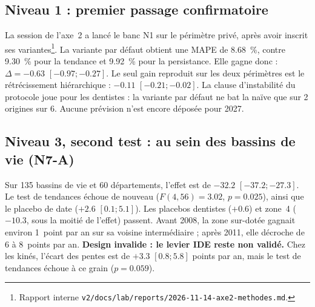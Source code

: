 \documentclass[11pt]{article}
\begin{document}
\subsection{Niveau 1 : premier passage confirmatoire}
La session de l'axe~2 a lancé le banc N1 sur le périmètre privé, après avoir inscrit ses
variantes\footnote{Rapport interne \texttt{v2/docs/lab/reports/2026-11-14-axe2-methodes.md}.}. La
variante par défaut obtient une MAPE de \num{8.68}\mesure{}~\%, contre \num{9.30}\mesure{}~\% pour la
tendance et \num{9.92}\mesure{}~\% pour la persistance. Elle gagne donc :
$\Delta = \num{-0.63}$\mesure{} $[\num{-0.97} ; \num{-0.27}]$. Le seul gain reproduit sur les deux
périmètres est le rétrécissement hiérarchique : $-\num{0.11}$\mesure{} $[\num{-0.21} ;
\num{-0.02}]$. La clause d'instabilité du protocole joue pour les dentistes : la variante par défaut
ne bat la naïve que sur 2\mesure{} origines sur 6. Aucune prévision n'est encore déposée pour 2027.

\subsection{Niveau 3, second test : au sein des bassins de vie (N7-A)}
Sur 135\mesure{} bassins de vie et 60\mesure{} départements, l'effet est de
$\num{-32.2}$\mesure{} $[\num{-37.2} ; \num{-27.3}]$. Le test de tendances échoue de nouveau
($F(4, 56) = \num{3.02}$, $p = \num{0.025}$\mesure{}), ainsi que le placebo de date ($+\num{2.6}$\mesure{}
$[\num{0.1} ; \num{5.1}]$). Les placebos dentistes ($+\num{0.6}$\mesure{}) et zone~4
($\num{-10.3}$\mesure{}, sous la moitié de l'effet) passent. Avant 2008, la zone sur-dotée gagnait
environ 1\mesure{}~point par an sur sa voisine intermédiaire ; après 2011, elle décroche de 6 à
8\mesure{}~points par an. \textbf{Design invalide : le levier IDE reste non validé.} Chez les kinés,
l'écart des pentes est de $+\num{3.3}$\mesure{} $[\num{0.8} ; \num{5.8}]$ points par an, mais le test de
tendances échoue à ce grain ($p = \num{0.059}$\mesure{}).
\end{document}

